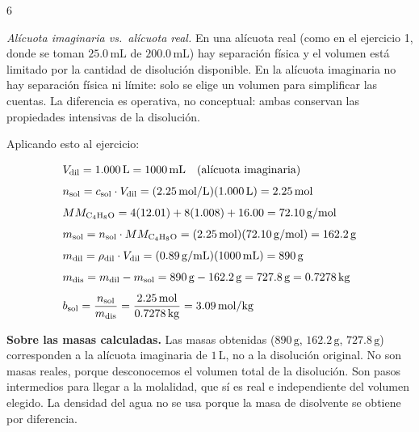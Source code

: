 \begin{exercise}{6}{}
\begin{notaimportante}
\textit{Alícuota imaginaria vs.\ alícuota real.} En una alícuota real (como en 
el ejercicio 1, donde se toman $25.0\,\mathrm{mL}$ de $200.0\,\mathrm{mL}$) hay 
separación física y el volumen está limitado por la cantidad de disolución 
disponible. En la alícuota imaginaria no hay separación física ni límite: solo 
se elige un volumen para simplificar las cuentas. La diferencia es operativa, 
no conceptual: ambas conservan las propiedades intensivas de la disolución.
\end{notaimportante}

Aplicando esto al ejercicio:

\begin{align*}
    &V_{\mathrm{dil}} = 1.000\,\mathrm{L} = 1000\,\mathrm{mL} 
        \quad \text{(alícuota imaginaria)} \\[4pt]
    &n_{\mathrm{sol}} = c_{\mathrm{sol}} \cdot V_{\mathrm{dil}}
        = (2.25\,\mathrm{mol/L})(1.000\,\mathrm{L})
        = 2.25\,\mathrm{mol} \\[4pt]
    &MM_{\ce{C4H8O}} = 4(12.01) + 8(1.008) + 16.00 = 72.10\,\mathrm{g/mol} \\[4pt]
    &m_{\mathrm{sol}} = n_{\mathrm{sol}} \cdot MM_{\ce{C4H8O}}
        = (2.25\,\mathrm{mol})(72.10\,\mathrm{g/mol})
        = 162.2\,\mathrm{g} \\[4pt]
    &m_{\mathrm{dil}} = \rho_{\mathrm{dil}} \cdot V_{\mathrm{dil}}
        = (0.89\,\mathrm{g/mL})(1000\,\mathrm{mL})
        = 890\,\mathrm{g} \\[4pt]
    &m_{\mathrm{dis}} = m_{\mathrm{dil}} - m_{\mathrm{sol}}
        = 890\,\mathrm{g} - 162.2\,\mathrm{g}
        = 727.8\,\mathrm{g} = 0.7278\,\mathrm{kg} \\[4pt]
    &b_{\mathrm{sol}} = \frac{n_{\mathrm{sol}}}{m_{\mathrm{dis}}}
        = \frac{2.25\,\mathrm{mol}}{0.7278\,\mathrm{kg}}
        = 3.09\,\mathrm{mol/kg}
\end{align*}

\begin{notaimportante}
\textbf{Sobre las masas calculadas.} Las masas obtenidas 
($890\,\mathrm{g}$, $162.2\,\mathrm{g}$, $727.8\,\mathrm{g}$) corresponden a la 
alícuota imaginaria de $1\,\mathrm{L}$, no a la disolución original. No son 
masas reales, porque desconocemos el volumen total de la disolución. Son pasos 
intermedios para llegar a la molalidad, que sí es real e independiente del 
volumen elegido. La densidad del agua no se usa porque la masa de disolvente se 
obtiene por diferencia.
\end{notaimportante}
\end{exercise}

